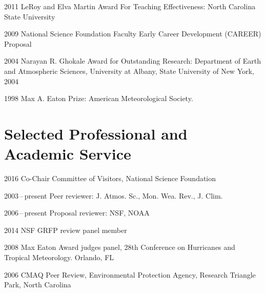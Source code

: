 \begin{tlist}

\item[2011] LeRoy and Elva Martin Award For Teaching Effectiveness: North Carolina State University

\item[2009] National Science Foundation Faculty Early Career Development (CAREER) Proposal

\item[2004] Narayan R. Ghokale Award for Outstanding Research: Department of Earth and Atmospheric Sciences, University at Albany, State University of New York, 2004

\item[1998] Max A. Eaton Prize: American Meteorological Society.

\end{tlist}



\section*{Selected Professional and Academic Service}

\begin{tlist}
\item[2016] Co-Chair Committee of Visitors, National Science Foundation
\item[2003\,--\,present] Peer reviewer: J. Atmos. Sc., Mon. Wea. Rev., J. Clim.
\item[2006\,--\,present] Proposal reviewer: NSF, NOAA
\item[2014] NSF GRFP review panel member
\item[2008] Max Eaton Award judges panel, 28th Conference on Hurricanes and Tropical Meteorology. Orlando, FL
\item[2006] CMAQ Peer Review, Environmental Protection Agency, Research Triangle Park, North Carolina
\end{tlist}
